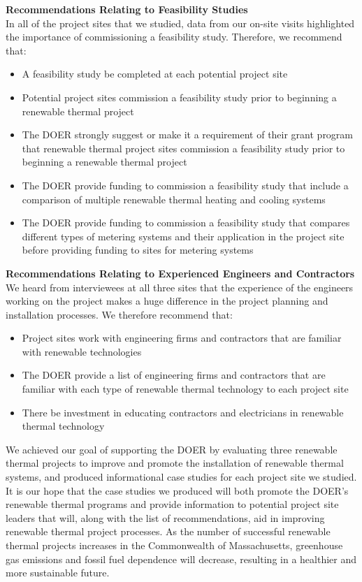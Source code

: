 \noindent
\textbf{Recommendations Relating to Feasibility Studies}\\
\indent In all of the project sites that we studied, data from our on-site visits highlighted the importance of commissioning a feasibility study. Therefore, we recommend that:
\begin{itemize}
  \item{A feasibility study be completed at each potential project site}
  \item{Potential project sites commission a feasibility study prior to beginning a renewable thermal project}
  \item{The DOER strongly suggest or make it a requirement of their grant program that renewable thermal project sites commission a feasibility study prior to beginning a renewable thermal project}
  \item{The DOER provide funding to commission a feasibility study that include a comparison of multiple renewable thermal heating and cooling systems}
  \item{The DOER provide funding to commission a feasibility study that compares different types of metering systems and their application in the project site before providing funding to sites for metering systems}
\end{itemize}

\noindent
\textbf{Recommendations Relating to Experienced Engineers and Contractors}\\
\indent We heard from interviewees at all three sites that the experience of the engineers working on the project makes a huge difference in the project planning and installation processes. We therefore recommend that:
\begin{itemize}
  \item{Project sites work with engineering firms and contractors that are familiar with renewable technologies}
  \item{The DOER provide a list of engineering firms and contractors that are familiar with each type of renewable thermal technology to each project site}
  \item{There be investment in educating contractors and electricians in renewable thermal technology}
\end{itemize}

\par We achieved our goal of supporting the DOER by evaluating three renewable thermal projects to improve and promote the installation of renewable thermal systems, and produced informational case studies for each project site we studied. It is our hope that the case studies we produced will both promote the DOER’s renewable thermal programs and provide information to potential project site leaders that will, along with the list of recommendations, aid in improving renewable thermal project processes. As the number of successful renewable thermal projects increases in the Commonwealth of Massachusetts, greenhouse gas emissions and fossil fuel dependence will decrease, resulting in a healthier and more sustainable future.